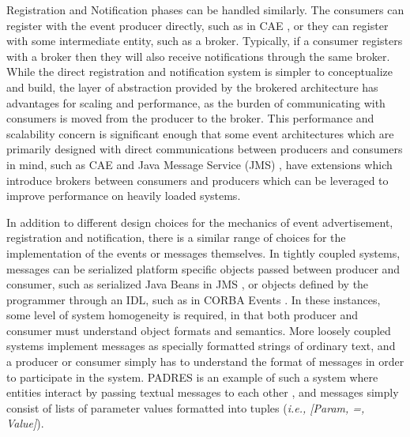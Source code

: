 \documentclass{acm_proc_article-sp}
\begin{document}
Registration and Notification phases can be handled similarly. The consumers can register with the event producer directly, such as in CAE \cite{Bacon:2000p6818}, or they can register with some intermediate entity, such as a broker. Typically, if a consumer registers with a broker then they will also receive notifications through the same broker. While the direct registration and notification system is simpler to conceptualize and build, the layer of abstraction provided by the brokered architecture has advantages for scaling and performance, as the burden of communicating with consumers is moved from the producer to the broker. This performance and scalability concern is significant enough that some event architectures which are primarily designed with direct communications between producers and consumers in mind, such as CAE \cite{Bacon:2000p6818} and Java Message Service (JMS) \cite{Oracle:2002p8432}, have extensions which introduce brokers between consumers and producers which can be leveraged to improve performance on heavily loaded systems.

In addition to different design choices for the mechanics of event advertisement, registration and notification, there is a similar range of choices for the implementation of the events or messages themselves. In tightly coupled systems, messages can be serialized platform specific objects passed between producer and consumer, such as serialized Java Beans in JMS \cite{Oracle:2002p8432}, or objects defined by the programmer through an IDL, such as in CORBA Events \cite{Siegel:1999p8569}. In these instances, some level of system homogeneity is required, in that both producer and consumer must understand object formats and semantics. More loosely coupled systems implement messages as specially formatted strings of ordinary text, and a producer or consumer simply has to understand the format of messages in order to participate in the system. PADRES is an example of such a system where entities interact by passing textual messages to each other \cite{Jacobsen:2010p8313}, and messages simply consist of lists of parameter values formatted into tuples ({\it i.e.,\/ [Param, =, Value]}).
\end{document}
